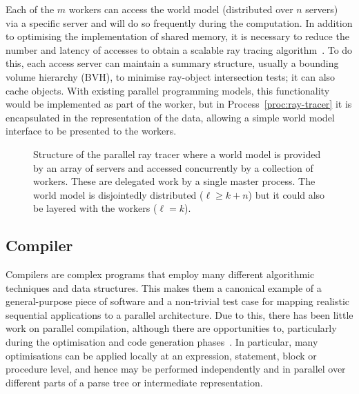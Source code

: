 \documentclass[11pt, conference, compsocconf, onecolumn]{IEEEtran}
\newcommand{\proc}[1]{Process~\ref{proc:#1}}
\newcounter{process}
\newcommand{\inputtikz}[1]{
\begin{center}\end{center}}
\begin{document}
Each of the $m$ workers can access the world model (distributed over $n$
servers) via a specific server and will do so frequently during the
computation. 
In addition to optimising the implementation of shared memory, it is necessary
to reduce the number and latency of accesses to obtain a scalable ray tracing
algorithm~\cite{Reinhard97}. To do this, each access server can maintain a
summary structure, usually a bounding volume hierarchy (BVH), to minimise
ray-object intersection tests; it can also cache objects.
With existing parallel programming models, this functionality would be
implemented as part of the worker, but in \proc{ray-tracer} it is encapsulated
in the representation of the data, allowing a simple world model interface to
be presented to the workers.

\begin{figure}[t]
\inputtikz{figures/ray-tracer}

\caption{Structure of the parallel ray tracer where a world model is provided
by an array of servers and accessed concurrently by a collection of workers.
These are delegated work by a single master process. The world model is
disjointedly distributed ($\ell \geq k+n$) but it could also be layered with the
workers ($\ell=k$).}

\label{fig:ray-tracer}
\end{figure}

\subsection{Compiler}



Compilers are complex programs that employ many different algorithmic
techniques and data structures. This makes them a canonical example of a
general-purpose piece of software and a non-trivial test case for mapping
realistic sequential applications to a parallel architecture.  Due to this,
there has been little work on parallel compilation, although there are
opportunities to, particularly during the optimisation and code generation
phases~\cite{Gross89}. In particular, many optimisations can be applied locally
at an expression, statement, block or procedure level, and hence may be
performed independently and in parallel over different parts of a parse tree
or intermediate representation.
\end{document}
